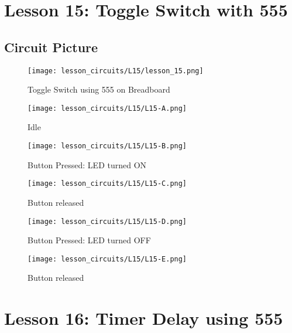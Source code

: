 \section{Lesson 15: Toggle Switch with 555}
\subsection{Circuit Picture}
\begin{figure}[htp]
    \centering
    \texttt{[image: lesson\_circuits/L15/lesson\_15.png]}
    \caption{Toggle Switch using 555 on Breadboard}
    \label{fig:555_ts_sch}
\end{figure}
\begin{figure}[htp]
    \centering
    \texttt{[image: lesson\_circuits/L15/L15-A.png]}
    \caption{Idle}
    \label{fig:555_ts_obb}
\end{figure}
\begin{figure}[htp]
    \centering
    \texttt{[image: lesson\_circuits/L15/L15-B.png]}
    \caption{Button Pressed: LED turned ON}
    \label{fig:555_ts_obb1}
\end{figure}
\begin{figure}[htp]
    \centering
    \texttt{[image: lesson\_circuits/L15/L15-C.png]}
    \caption{Button released}
    \label{fig:555_ts_obb2}
\end{figure}
\begin{figure}[htp]
    \centering
    \texttt{[image: lesson\_circuits/L15/L15-D.png]}
    \caption{Button Pressed: LED turned OFF}
    \label{fig:555_ts_obb3}
\end{figure}
\begin{figure}[htp]
    \centering
    \texttt{[image: lesson\_circuits/L15/L15-E.png]}
    \caption{Button released}
    \label{fig:555_ts_obb4}
\end{figure}
\section{Lesson 16: Timer Delay using 555}
